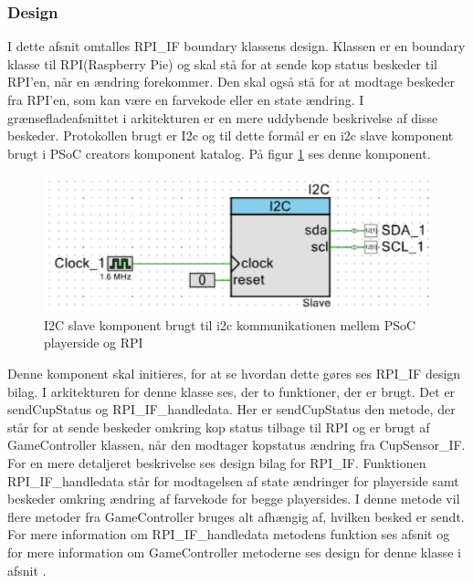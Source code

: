 \documentclass[Rapport/Playerside/RPI_IF/RPI_IF.tex]{subfiles}
\begin{document}
\subsubsection{Design}
I dette afsnit omtalles RPI\_IF boundary klassens design. Klassen er en boundary klasse til RPI(Raspberry Pie) og skal stå for at sende kop status beskeder til RPI'en, når en ændring forekommer. Den skal også stå for at modtage beskeder fra RPI'en, som kan være en farvekode eller en state ændring. I grænsefladeafsnittet i arkitekturen er en mere uddybende beskrivelse af disse beskeder. Protokollen brugt er I2c og til dette formål er en i2c slave komponent brugt i PSoC creators komponent katalog. På figur \ref{fig:I2c_slave} ses denne komponent.
\begin{figure}
    \centering 
    \includegraphics[width=\linewidth]{Softwaredesign/RPI_IF/graphics/i2c_enhed.PNG}
    \caption{I2C slave komponent brugt til i2c kommunikationen mellem PSoC playerside og RPI}
    \label{fig:I2c_slave}
\end{figure}
Denne komponent skal initieres, for at se hvordan dette gøres ses RPI\_IF design bilag. I arkitekturen for denne klasse ses, der to funktioner, der er brugt. Det er sendCupStatus og RPI\_IF\_handledata. Her er sendCupStatus den metode, der står for at sende beskeder omkring kop status tilbage til RPI og er brugt af GameController klassen, når den modtager kopstatus ændring fra CupSensor\_IF. For en mere detaljeret beskrivelse ses design bilag for RPI\_IF. Funktionen  RPI\_IF\_handledata står for modtagelsen af state ændringer for playerside samt beskeder omkring ændring af farvekode for begge playersides. I denne metode vil flere metoder fra GameController bruges alt afhængig af, hvilken besked er sendt. For mere information om RPI\_IF\_handledata metodens funktion ses afsnit  og for mere information om GameController metoderne ses design for denne klasse i afsnit .
\end{document}

